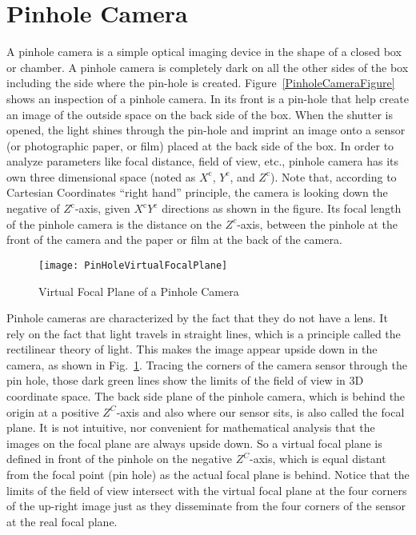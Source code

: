 \section{Pinhole Camera}
\label{sectionPinholeCamera}
\indent
A pinhole camera is a simple optical imaging device in the shape of a closed box or chamber. A pinhole camera is completely dark on all the other sides of the box including the side where the pin-hole is created. Figure~\ref{PinholeCameraFigure} shows an inspection of a pinhole camera. In its front is a pin-hole that help create an image of the outside space on the back side of the box. When the shutter is opened, the light shines through the pin-hole and imprint an image onto a sensor (or photographic paper, or film) placed at the back side of the box. In order to analyze parameters like focal distance, field of view, etc., pinhole camera has its own three dimensional space (noted as \(X^\text{c}\), \(Y^\text{c}\), and \(Z^\text{c}\)). Note that, according to Cartesian Coordinates \enquote{right hand} principle, the camera is looking down the negative of \(Z^\text{c}\)-axis, given \(X^\text{c}\)\(Y^\text{c}\) directions as shown in the figure. Its focal length of the pinhole camera is the distance on the \(Z^c\)-axis, between the pinhole at the front of the camera and the paper or film at the back of the camera.
\\\indent
\begin{figure}[!t]
\centering
\texttt{[image: PinHoleVirtualFocalPlane]}
\caption{Virtual Focal Plane of a Pinhole Camera}
\label{PinHoleVirtualFocalPlane}
\end{figure}%
%
%
Pinhole cameras are characterized by the fact that they do not have a lens. It rely on the fact that light travels in straight lines, which is a principle called the rectilinear theory of light. This makes the image appear upside down in the camera, as shown in Fig.~\ref{PinHoleVirtualFocalPlane}. Tracing the corners of the camera sensor through the pin hole, those dark green lines show the limits of the field of view in 3D coordinate space. The back side plane of the pinhole camera, which is behind the origin at a positive \(Z^C\)-axis and also where our sensor sits, is also called the focal plane. It is not intuitive, nor convenient for mathematical analysis that the images on the focal plane are always upside down. So a virtual focal plane is defined in front of the pinhole on the negative \(Z^C\)-axis, which is equal distant from the focal point (pin hole) as the actual focal plane is behind. Notice that the limits of the field of view intersect with the virtual focal plane at the four corners of the up-right image just as they disseminate from the four corners of the sensor at the real focal plane.

